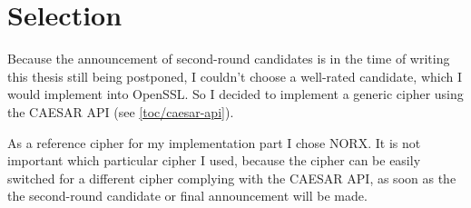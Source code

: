 \section{Selection}

Because the announcement of second-round candidates is in the time of writing this thesis still being postponed, I couldn't choose a well-rated candidate, which I would implement into OpenSSL. So I decided to implement a generic cipher using the CAESAR API (see \autoref{toc/caesar-api}).

As a reference cipher for my implementation part I chose NORX. It is not important which particular cipher I used, because the cipher can be easily switched for a different cipher complying with the CAESAR API, as soon as the the second-round candidate or final announcement will be made.
